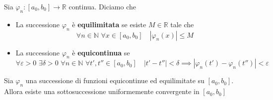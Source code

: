     Sia \(\varphi_n : [a_{0}, b_{0}] \to \mathbb{R}\) continua. Diciamo che
\begin{itemize}[label = --]
    \item La successione \(\varphi_n\) è \textbf{equilimitata} se esiste \(M \in
        \mathbb{R}\) tale che
        \[
            \forall n \in \mathbb{N} \,\, \forall x \in [a_{0}, b_{0}] \quad
            |\varphi_n(x)| \le M
        \]
    \item La successione \(\varphi_n\) è \textbf{equicontinua} se 
        \[
            \forall \varepsilon > 0 \,\, \exists \delta > 0 \,\, \forall n \in
            \mathbb{N} \,\, \forall t',
            t'' \in [a_{0}, b_{0}] \quad |t' - t''| < \delta \implies
            |\varphi_n(t') - \varphi_n(t'')| < \varepsilon
        \]
\end{itemize}
\begin{theorem}
    Sia \(\varphi_n\) una successione di funzioni equicontinue ed equilimitate
    su \([a_{0}, b_{0}]\). Allora esiste una sottosuccessione uniformemente
    convergente in \([a_{0}, b_{0}]\) 
\end{theorem}
